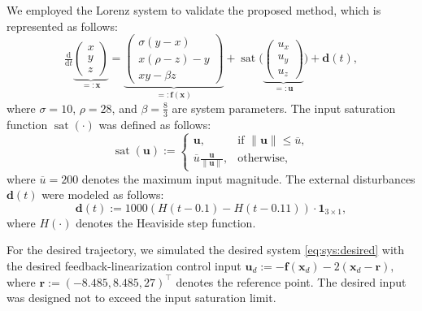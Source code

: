 \documentclass{ifacconf}
\newcommand*{\mv}[1]{\boldsymbol{#1}} %
\newcommand*{\norm}[1]{\lVert #1 \rVert} %
\DeclareMathOperator{\mysat}{{sat}}       %
\newcommand\der{\mathrm d}
\newcommand*{\ddtt}{
   \tfrac{\der}{\der t}
}
\begin{document}
We employed the Lorenz system to validate the proposed method, which is represented as follows:
\begin{equation}
   \ddtt
   \underbrace{
      \begin{pmatrix}
         x\\y\\z
      \end{pmatrix}
   }_{=:\mv{x}}
   =
   \underbrace{
      \begin{pmatrix}
         \sigma(y-x)
         \\
         x(\rho-z)-y
         \\
         xy-\beta z
      \end{pmatrix}
   }_{=:\mv{f}(\mv{x})}
   +
   \mysat
   \bigg(
      \underbrace{
         \begin{pmatrix}
            u_x\\u_y\\u_z
         \end{pmatrix}
      }_{=:\mv{u}}
   \bigg)
   +
   \mv{d}(t)
   ,
\end{equation}
where $\sigma=10$, $\rho=28$, and $\beta=\tfrac{8}{3}$ are system parameters.
The input saturation function $\mysat(\cdot)$ was defined as follows:
\begin{equation}
   \mysat(\mv{u})
   :=
   \begin{cases}
      \mv{u}
      ,
      & \text{if } \norm{\mv{u}} \le \overline{u}
      ,
      \\
      \overline{u} \tfrac{\mv{u}}{\norm{\mv{u}}}
      ,
      & \text{otherwise}
      ,
   \end{cases}
\end{equation}
where $\overline{u}=200$ denotes the maximum input magnitude.
The external disturbances $\mv{d}(t)$ were modeled as follows:
\begin{equation}
   \mv{d}(t)
   :=
   1000 (H(t-0.1)-H(t-0.11))
   \cdot
   \mv{1}_{3\times1}
   ,
\end{equation}
where $H(\cdot)$ denotes the Heaviside step function.

For the desired trajectory, we simulated the desired system \eqref{eq:sys:desired} with the desired feedback-linearization control input
$
   \mv{u}_d
   :=
   -\mv{f}(\mv{x}_d) - 2(\mv{x}_d - \mv{r})
   ,
$
where $\mv{r}:=(-8.485,8.485,27)^\top$ denotes the reference point.
The desired input was designed not to exceed the input saturation limit.
\end{document}
